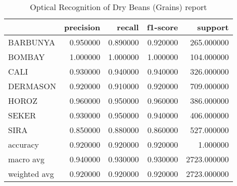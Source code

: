 \begin{table}
\caption{Optical Recognition of Dry Beans (Grains) report}
\begin{tabular}{lrrrr}
\toprule
 & precision & recall & f1-score & support \\
\midrule
BARBUNYA & 0.950000 & 0.890000 & 0.920000 & 265.000000 \\
BOMBAY & 1.000000 & 1.000000 & 1.000000 & 104.000000 \\
CALI & 0.930000 & 0.940000 & 0.940000 & 326.000000 \\
DERMASON & 0.920000 & 0.910000 & 0.920000 & 709.000000 \\
HOROZ & 0.960000 & 0.950000 & 0.960000 & 386.000000 \\
SEKER & 0.930000 & 0.950000 & 0.940000 & 406.000000 \\
SIRA & 0.850000 & 0.880000 & 0.860000 & 527.000000 \\
accuracy & 0.920000 & 0.920000 & 0.920000 & 1.000000 \\
macro avg & 0.940000 & 0.930000 & 0.930000 & 2723.000000 \\
weighted avg & 0.920000 & 0.920000 & 0.920000 & 2723.000000 \\
\bottomrule
\end{tabular}
\end{table}
